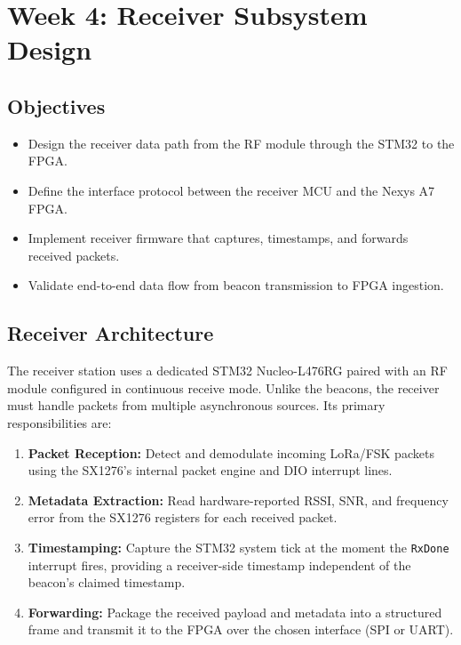 \documentclass[11pt,letterpaper]{article}
\begin{document}
	\newpage
	\section{Week 4: Receiver Subsystem Design}
	\label{sec:receiver}
	
	\subsection{Objectives}
	
	\begin{itemize}[leftmargin=2em]
		\item Design the receiver data path from the RF module through the STM32 to the FPGA.
		\item Define the interface protocol between the receiver MCU and the Nexys A7 FPGA.
		\item Implement receiver firmware that captures, timestamps, and forwards received packets.
		\item Validate end-to-end data flow from beacon transmission to FPGA ingestion.
	\end{itemize}
	
	\subsection{Receiver Architecture}
	
	The receiver station uses a dedicated STM32 Nucleo-L476RG paired with an RF module configured in continuous receive mode. Unlike the beacons, the receiver must handle packets from multiple asynchronous sources. Its primary responsibilities are:
	
	\begin{enumerate}[leftmargin=2em]
		\item \textbf{Packet Reception:} Detect and demodulate incoming LoRa/FSK packets using the SX1276's internal packet engine and DIO interrupt lines.
		\item \textbf{Metadata Extraction:} Read hardware-reported RSSI, SNR, and frequency error from the SX1276 registers for each received packet.
		\item \textbf{Timestamping:} Capture the STM32 system tick at the moment the \texttt{RxDone} interrupt fires, providing a receiver-side timestamp independent of the beacon's claimed timestamp.
		\item \textbf{Forwarding:} Package the received payload and metadata into a structured frame and transmit it to the FPGA over the chosen interface (SPI or UART).
	\end{enumerate}
	
\end{document}
